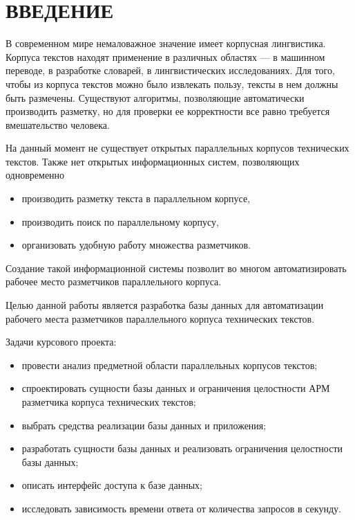 \section*{ВВЕДЕНИЕ}

В современном мире немаловажное значение имеет корпусная лингвистика.
Корпуса текстов находят применение в различных областях --- в машинном переводе, в разработке словарей, в лингвистических исследованиях.
Для того, чтобы из корпуса текстов можно было извлекать пользу, тексты в нем должны быть размечены.
Существуют алгоритмы, позволяющие автоматически производить разметку, но для проверки ее корректности все равно требуется вмешательство человека.

На данный момент не существует открытых параллельных корпусов технических текстов.
Также нет открытых информационных систем, позволяющих одновременно
\begin{itemize}
    \item производить разметку текста в параллельном корпусе,
    \item производить поиск по параллельному корпусу,
    \item организовать удобную работу множества разметчиков.
\end{itemize}

Создание такой информационной системы позволит во многом автоматизировать рабочее место разметчиков параллельного корпуса.

Целью данной работы является разработка базы данных для автоматизации рабочего места разметчиков параллельного корпуса технических текстов.

Задачи курсового проекта:
\begin{itemize}
    \item провести анализ предметной области параллельных корпусов текстов;
    \item спроектировать сущности базы данных и ограничения целостности АРМ разметчика корпуса технических текстов;
    \item выбрать средства реализации базы данных и приложения;
    \item разработать сущности базы данных и реализовать ограничения целостности базы данных;
    \item описать интерфейс доступа к базе данных;
    \item исследовать зависимость времени ответа от количества запросов в секунду.
\end{itemize}
